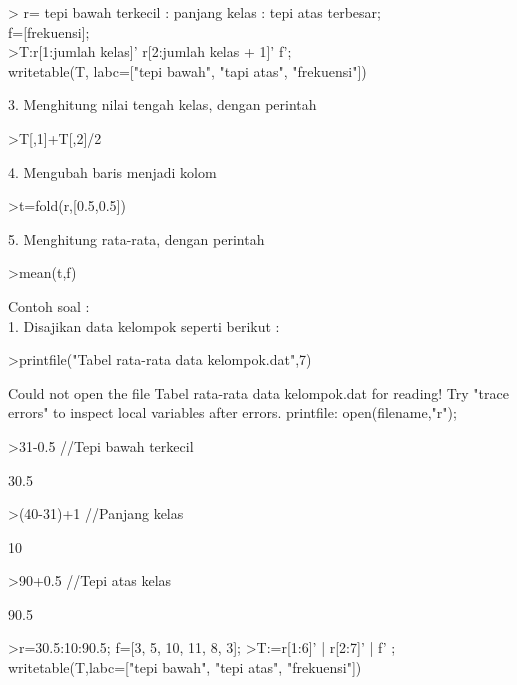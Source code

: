 \documentclass[a4paper,10pt]{article}
\begin{document}
\begin{eulernotebook}
\begin{eulercomment}
\begin{eulercomment}
\begin{eulercomment}
\begin{eulercomment}
\begin{eulercomment}
\begin{eulercomment}
\begin{eulercomment}
\begin{eulercomment}
\begin{eulercomment}
\begin{eulercomment}
\begin{eulercomment}
\begin{eulercomment}
\begin{eulercomment}
\begin{eulercomment}
\begin{eulercomment}
\textgreater{} r= tepi bawah terkecil : panjang kelas : tepi atas terbesar;\\
f=[frekuensi];\\
\textgreater{}T:r[1:jumlah kelas]' \textbar{} r[2:jumlah kelas + 1]' \textbar{}f';\\
writetable(T, labc=["tepi bawah", "tapi atas", "frekuensi"])

3. Menghitung nilai tengah kelas, dengan perintah

\textgreater{}T[,1]+T[,2]/2

4. Mengubah baris menjadi kolom

\textgreater{}t=fold(r,[0.5,0.5])

5. Menghitung rata-rata, dengan perintah

\textgreater{}mean(t,f)

Contoh soal :\\
1. Disajikan data kelompok seperti berikut :
\end{eulercomment}
\begin{eulerprompt}
>printfile("Tabel rata-rata data kelompok.dat",7)
\end{eulerprompt}
\begin{euleroutput}
  Could not open the file
  Tabel rata-rata data kelompok.dat
  for reading!
  Try "trace errors" to inspect local variables after errors.
  printfile:
      open(filename,"r");
\end{euleroutput}
\begin{eulerprompt}
>31-0.5  //Tepi bawah terkecil
\end{eulerprompt}
\begin{euleroutput}
  30.5
\end{euleroutput}
\begin{eulerprompt}
>(40-31)+1  //Panjang kelas
\end{eulerprompt}
\begin{euleroutput}
  10
\end{euleroutput}
\begin{eulerprompt}
>90+0.5 //Tepi atas kelas
\end{eulerprompt}
\begin{euleroutput}
  90.5
\end{euleroutput}
\begin{eulerprompt}
>r=30.5:10:90.5; f=[3, 5, 10, 11, 8, 3];
>T:=r[1:6]' | r[2:7]' | f' ; writetable(T,labc=["tepi bawah", "tepi atas", "frekuensi"])
\end{eulerprompt}
\begin{euleroutput}

\end{euleroutput}
\end{eulercomment}
\end{eulercomment}
\end{eulercomment}
\end{eulercomment}
\end{eulercomment}
\end{eulercomment}
\end{eulercomment}
\end{eulercomment}
\end{eulercomment}
\end{eulercomment}
\end{eulercomment}
\end{eulercomment}
\end{eulercomment}
\end{eulercomment}
\end{eulernotebook}
\end{document}
